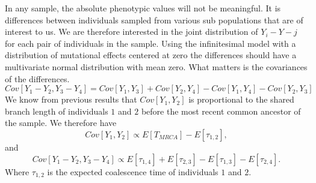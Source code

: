 In any sample, the absolute phenotypic values will not be meaningful. It is differences between individuals sampled from
various sub populations that are of interest to us. We are therefore interested in the joint distribution of $Y_i-Y-j$
for each pair of individuals in the sample. Using the infinitesimal model with a distribution of mutational effects
centered at zero the differences should have a multivariate normal distribution with mean zero. What matters is the
covariances of the differences.
\begin{equation}
  \label{eq:cov}
  Cov[Y_1-Y_2,Y_3-Y_4]=Cov[Y_1,Y_3]+Cov[Y_2,Y_4]-Cov[Y_1,Y_4]-Cov[Y_2,Y_3]
\end{equation}
We know from previous results that $Cov[Y_1,Y_2]$ is proportional to the shared branch length of individuals $1$ and $2$
before the most recent common ancestor of the sample. We therefore have
\begin{equation}
  \label{eq:covprop}
  Cov[Y_1,Y_2] \propto E[T_{MRCA}]-E[\tau_{1,2}],
\end{equation}
and
\begin{equation}
  \label{eq:covcoal}
  Cov[Y_1-Y_2,Y_3-Y_4] \propto E[\tau_{1,4}] + E[\tau_{2,3}] - E[\tau_{1,3}] - E[\tau_{2,4}].
\end{equation}
Where $\tau_{1,2}$ is the expected coalescence time of individuals $1$ and $2$. 
